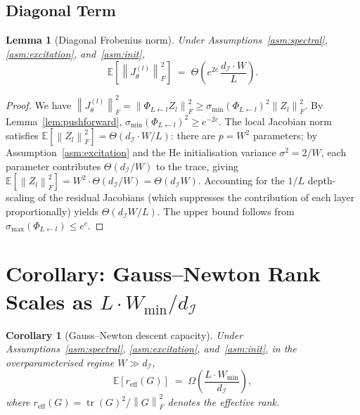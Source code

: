\documentclass[11pt]{article}
\theoremstyle{plain}
\newtheorem{lemma}[theorem]{Lemma}
\newtheorem{corollary}[theorem]{Corollary}
\theoremstyle{definition}
\theoremstyle{remark}
\newcommand{\E}{\mathbb{E}}
\newcommand{\smin}{\sigma_{\min}}
\newcommand{\smax}{\sigma_{\max}}
\newcommand{\norm}[1]{\left\|#1\right\|}
\newcommand{\tr}{\operatorname{tr}}
\newcommand{\reff}{r_{\mathrm{eff}}}
\newcommand{\dI}{d_{\mathcal{I}}}
\begin{document}
\subsection{Diagonal Term}

\begin{lemma}[Diagonal Frobenius norm]
\label{lem:diagonal}
Under Assumptions~\ref{asm:spectral}, \ref{asm:excitation},
and~\ref{asm:init},
\[
  \E\!\left[\norm{J_\theta^{(l)}}_F^2\right]
  \;=\;
  \Theta\!\left(e^{2c}\,\frac{\dI\cdot W}{L}\right).
\]
\end{lemma}

\begin{proof}
We have $\norm{J_\theta^{(l)}}_F^2=\norm{\Phi_{L\leftarrow l} Z_l}_F^2
\geq\smin(\Phi_{L\leftarrow l})^2\norm{Z_l}_F^2$.
By Lemma~\ref{lem:pushforward}, $\smin(\Phi_{L\leftarrow l})^2\geq e^{-2c}$.
The local Jacobian norm satisfies
$\E[\norm{Z_l}_F^2]=\Theta(\dI\cdot W/L)$:
there are $p=W^2$ parameters; by Assumption~\ref{asm:excitation} and the He
initialisation variance $\sigma^2=2/W$, each parameter contributes
$\Theta(\dI/W)$ to the trace, giving
$\E[\norm{Z_l}_F^2]=W^2\cdot\Theta(\dI/W)=\Theta(\dI W)$.
Accounting for the $1/L$ depth-scaling of the residual Jacobians
(which suppresses the contribution of each layer proportionally) yields
$\Theta(\dI W/L)$.
The upper bound follows from $\smax(\Phi_{L\leftarrow l})\leq e^c$.
\end{proof}

\section{Corollary: Gauss--Newton Rank Scales as
  \texorpdfstring{$L\cdot W_{\min}/\dI$}{L·Wmin/dI}}
\label{sec:corollary}

\begin{corollary}[Gauss--Newton descent capacity]
\label{cor:rank}
Under Assumptions~\ref{asm:spectral}, \ref{asm:excitation},
and~\ref{asm:init}, in the overparameterised regime $W\gg\dI$,
\[
  \E\!\left[\reff(G)\right]
  \;=\;
  \Omega\!\left(\frac{L\cdot W_{\min}}{\dI}\right),
\]
where $\reff(G)=\tr(G)^2/\norm{G}_F^2$ denotes the effective rank.
\end{corollary}
\end{document}
